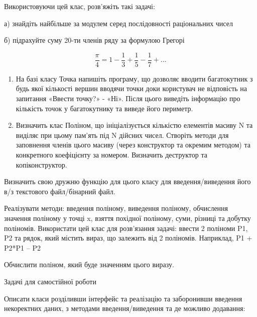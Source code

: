 \documentclass[]{article}
\makeatletter
\newcommand{\xslalph}[1]{\expandafter\@xslalph\csname c@#1\endcsname}
\newcommand{\@xslalph}[1]{%
    \ifcase#1\or а\or б\or в\or г\or д\or e\or є\or ж\or з\or i%
    \or й\or к\or л\or м\or н\or о\or п\or р\or с\or т%
    \or у\or ф\or х\or ц\or ч\or ш\or ю\or я\or аа\or бб\or вв%
    \else\@ctrerr\fi%
}
\makeatother
\begin{document}
\begin{enumerate}
\begin{enumerate}[label=\xslalph*)]
\begin{enumerate}
\begin{enumerate}[label=\xslalph*)]
Використовуючи цей клас, розв'яжіть такі задачі:

а) знайдіть найбільше за модулем серед послідовності раціональних чисел

б) підрахуйте суму 20-ти членів ряду за формулою Грегорі

\[\frac{\pi}{4} = 1 - \frac{1}{3} + \frac{1}{5} - \frac{1}{7} + \ldots\]

\begin{enumerate}
\def\labelenumi{\arabic{enumi})}
\item
  На базі класу Точка напишіть програму, що дозволяє вводити
  багатокутник з будь якої кількості вершин вводячи точки доки
  користувач не відповість на запитання «Ввести точку?» - «Ні». Після
  цього виведіть інформацію про кількість точок у багатокутнику та
  виведе його периметр.
\item
  Визначить клас Поліном, що ініціалізується кількістю елементів масиву
  N та виділяє при цьому пам'ять під N дійсних чисел. Створіть методи
  для заповнення членів цього масиву (через конструктор та окремим
  методом) та конкретного коефіцієнту за номером. Визначить деструктор
  та копіконструктор.
\end{enumerate}

Визначить свою дружню функцію для цього класу для введення/виведення
його в/з текстового файл/бінарний файл.

Реалізувати методи: введення поліному, виведення поліному, обчислення
значення поліному у точці x, взяття похідної поліному, суми, різниці та
добутку поліномів. Використати цей клас для розв'язання задачі: ввести 2
поліноми P1, P2 та рядок, який містить вираз, що залежить від 2
поліномів. Наприклад, P1 + P2*P1 -- P2

Обчислити поліном, який буде значенням цього виразу.

Задачі для самостійної роботи

Описати класи розділивши інтерфейс та реалізацію та заборонивши введення
некоректних даних, з методами введення/виведення та де можливо
додавання:


\end{enumerate}
\end{enumerate}
\end{enumerate}
\end{enumerate}
\end{document}

